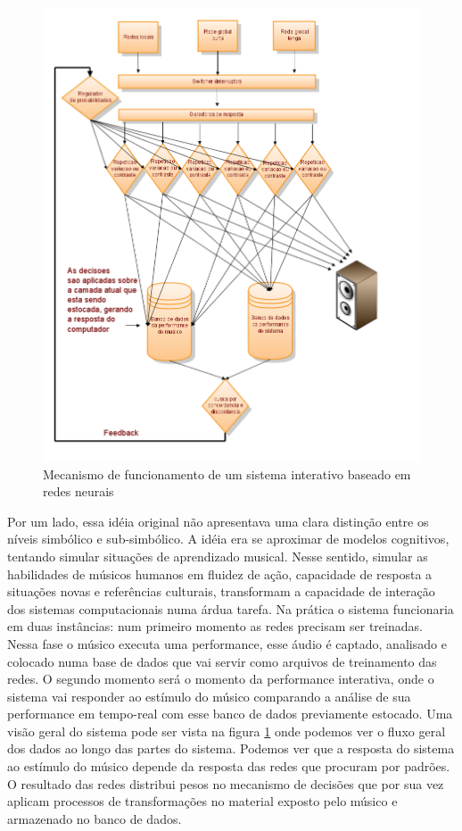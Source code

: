 \documentclass{ppgmus}
\begin{document}
\begin{figure}
\includegraphics[scale=.7]{mecanismo}
\caption{Mecanismo de funcionamento de um sistema interativo baseado em redes neurais}
\label{mecanismo}
\end{figure}



Por um lado, essa idéia original não apresentava uma clara distinção entre os níveis simbólico e sub-simbólico.
A idéia era se aproximar de modelos cognitivos, tentando simular situações de aprendizado musical.
Nesse sentido, simular as habilidades de músicos humanos em fluidez de ação, capacidade de 
resposta a situações novas e referências culturais, transformam a capacidade de interação dos sistemas computacionais 
numa árdua tarefa. Na prática o sistema funcionaria em duas instâncias: num primeiro momento as redes precisam ser 
treinadas. Nessa fase o músico executa uma performance, esse áudio é captado, analisado e colocado numa base de dados 
que vai servir como arquivos de treinamento das redes. O segundo momento será o momento da performance interativa, 
onde o sistema vai responder ao estímulo do músico comparando a análise de sua performance em tempo-real com esse 
banco de dados previamente estocado. Uma visão geral do sistema pode ser vista na figura \ref{mecanismo} onde podemos ver o fluxo 
geral dos dados ao longo das partes do sistema. Podemos ver que a resposta do sistema ao estímulo do músico depende 
da resposta das redes que procuram por padrões. O resultado das redes distribui pesos no mecanismo de decisões que por 
sua vez aplicam processos de transformações no material exposto pelo músico e armazenado no banco de dados.
   
\end{document}
